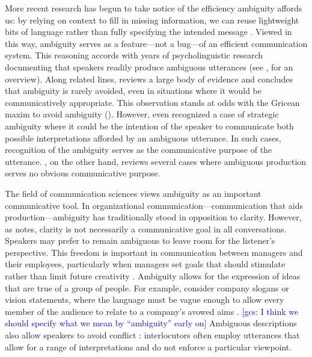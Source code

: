 \documentclass[10pt,a4paper]{article}
\newcommand{\gcs}[1]{\textcolor{blue}{[gcs: #1]}}
\begin{document}
More recent research has begun to take notice of the efficiency ambiguity affords us: by relying on context to fill in missing information, we can reuse lightweight bits of language rather than fully specifying the intended message \cite{levinson2000,piantadosietal2012,wasow2015}. 
Viewed in this way, ambiguity serves as a feature---not a bug---of an efficient communication system.
This reasoning accords with years of psycholinguistic research documenting that speakers readily produce ambiguous utterances (see , for an overview). 
Along related lines,  reviews a large body of evidence and concludes that ambiguity is rarely avoided, even in situations where it would be communicatively appropriate.
This observation stands at odds with the Gricean maxim to avoid ambiguity ().
However, even \citeauthor{grice1975} recognized a case of strategic ambiguity where it could be the intention of the speaker to communicate both possible interpretations afforded by an ambiguous utterance. In such cases, recognition of the ambiguity serves as the communicative purpose of the utterance. \citeauthor{wasow2015}, on the other hand, reviews several cases where ambiguous production serves no obvious communicative purpose.

The field of communication sciences views ambiguity as an important communicative tool. %
In organizational communication---communication that aids production---ambiguity has traditionally stood in opposition to clarity. However, as  notes, clarity is not necessarily a communicative goal in all conversations. Speakers may prefer to remain ambiguous to leave room for the listener's perspective. This freedom is important in communication between managers and their employees, particularly when managers set goals that should stimulate rather than limit future creativity \cite{mohr1983implications}. Ambiguity allows for the expression of ideas that are true of a group of people. For example, consider company slogans or vision statements, where the language must be vague enough to allow every member of the audience to relate to a company's avowed aims \cite{carmon2013}. \gcs{I think we should specify what we mean by ``ambiguity'' early on} Ambiguous descriptions also allow speakers to avoid conflict \cite{pascale1981art}: interlocutors often employ utterances that allow for a range of interpretations and do not enforce a particular viewpoint.
\end{document}
